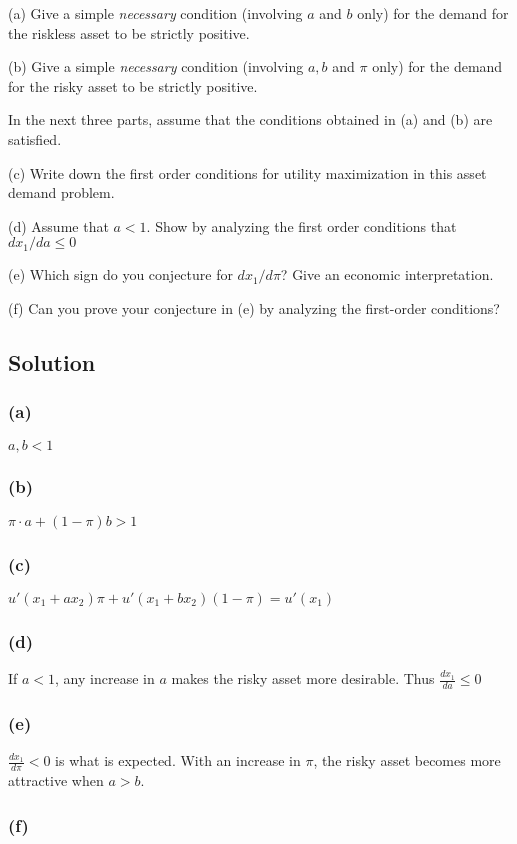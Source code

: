\documentclass[10pt, a4paper]{article}
\begin{document}
      (a) Give a simple \textit{necessary} condition (involving $a$ and $b$ only) for the demand for the riskless asset to be strictly positive.

      (b) Give a simple \textit{necessary} condition (involving $a,b$ and $\pi$ only) for the demand for the risky asset to be strictly positive.
     
      In the next three parts, assume that the conditions obtained in (a) and (b) are satisfied.

      (c) Write down the first order conditions for utility maximization in this asset demand problem.

      (d) Assume that $a<1$. Show by analyzing the first order conditions that $dx_1/da\leq0$

      (e) Which sign do you conjecture for $dx_1/d\pi$? Give an economic interpretation.

      (f) Can you prove your conjecture in (e) by analyzing the first-order conditions?
    \subsection*{Solution}
      \subsubsection*{(a)}
        $a,b < 1$
      \subsubsection*{(b)}
        $\pi\cdot a + (1-\pi)b > 1$
      \subsubsection*{(c)}
        $u'(x_1+ax_2)\pi + u'(x_1 + bx_2)(1-\pi) = u'(x_1)$
      \subsubsection*{(d)}
        If $a<1$, any increase in $a$ makes the risky asset more desirable. Thus $\frac{dx_1}{da}\leq 0$
      \subsubsection*{(e)}
        $\frac{dx_1}{d\pi}<0$ is what is expected. With an increase in $\pi$, the risky asset becomes more attractive when $a>b$.
      \subsubsection*{(f)}
        
\end{document}
